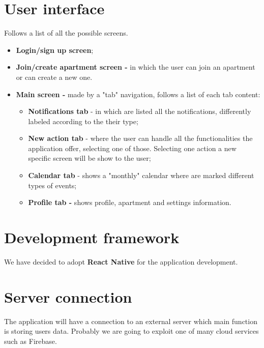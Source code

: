 \documentclass[]{article}
\begin{document}
	\section{User interface}
	
	Follows a list of all the possible screens.
	
	\begin{itemize}
		\item \textbf{Login/sign up screen};
		\item \textbf{Join/create apartment screen -} in which the user can join an apartment 
		or can create a new one.
		\item \textbf{Main screen -} made by a "tab" navigation, follows a list of each tab content:  
		\begin{itemize}
			\item \textbf{Notifications tab} - in which are listed all the notifications, 
			differently labeled according to the their type;
			\item \textbf{New action tab} - where the user can handle all the functionalities
			the application offer, selecting one of those. Selecting one action a new specific screen
			will be show to the user;
			\item \textbf{Calendar tab} - shows a "monthly" calendar where are marked different types of events;
			\item \textbf{Profile tab -} shows profile, apartment and settings information.
		\end{itemize}
			
	\end{itemize}

	\section{Development framework}
	We have decided to adopt \textbf{React Native} for the application development.

	\section{Server connection}
	
	The application will have a connection to an external server which main function is storing users data.
	Probably we are going to exploit one of many cloud services such as Firebase. 
\end{document}

